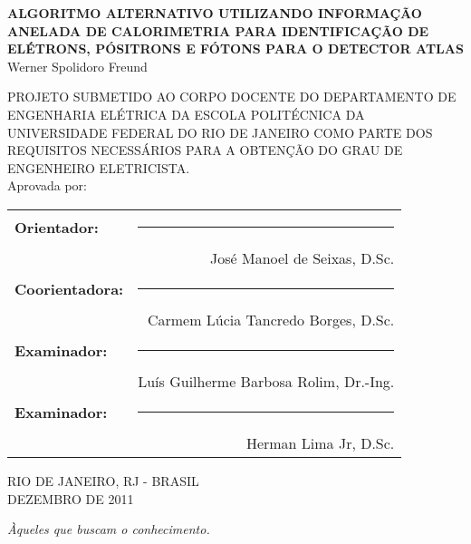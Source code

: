 \begin{titlepage}
	\begin{center}
		{\large \uppercase{\bf{Algoritmo Alternativo utilizando informação anelada
de calorimetria para identificação de elétrons, pósitrons e fótons para 
o detector ATLAS}}}\\[0.9cm]
    {Werner Spolidoro Freund}\\[0.9cm]
  \end{center}

		{\uppercase{\footnotesize{PROJETO SUBMETIDO AO CORPO DOCENTE DO DEPARTAMENTO 
DE ENGENHARIA ELÉTRICA DA ESCOLA POLITÉCNICA DA UNIVERSIDADE FEDERAL DO RIO 
DE JANEIRO COMO PARTE DOS REQUISITOS NECESSÁRIOS PARA A OBTENÇÃO DO GRAU 
DE ENGENHEIRO ELETRICISTA.}}}\\[0.3cm]

    {Aprovada por:}

  \begin{flushright}
		\begin{tabular}{lr}
			{\bf Orientador:} & \rule{8cm}{0.4pt} \\
					 & José Manoel de Seixas, D.Sc. \\[0.5cm]
			{\bf Coorientadora:}& \rule{8cm}{0.4pt} \\ 
					 & Carmem Lúcia Tancredo Borges, D.Sc. \\[0.5cm]
			{\bf Examinador:}& \rule{8cm}{0.4pt} \\
					 & Luís Guilherme Barbosa Rolim, Dr.-Ing. \\[0.5cm]
			{\bf Examinador:}& \rule{8cm}{0.4pt} \\
					 & Herman Lima Jr, D.Sc. \\[0.5cm]
		\end{tabular}
	\end{flushright}
  \vfill
  \begin{center}
		\begin{large}
      \uppercase{
			RIO DE JANEIRO, RJ - BRASIL \\
      DEZEMBRO DE 2011}
		\end{large}
  \end{center}
\end{titlepage}

\cleardoublepage

\null
\vfill
\begin{flushright}
  \em{Àqueles que buscam o conhecimento.}\\
\end{flushright}
